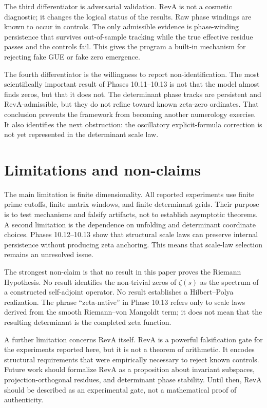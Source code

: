 \documentclass[11pt]{article}
\theoremstyle{definition}
\theoremstyle{plain}
\begin{document}
The third differentiator is adversarial validation.  RevA is not a cosmetic diagnostic; it changes the logical status of the results.  Raw phase windings are known to occur in controls.  The only admissible evidence is phase-winding persistence that survives out-of-sample tracking while the true effective residue passes and the controls fail.  This gives the program a built-in mechanism for rejecting fake GUE or fake zero emergence.

The fourth differentiator is the willingness to report non-identification.  The most scientifically important result of Phases 10.11--10.13 is not that the model almost finds zeros, but that it does not.  The determinant phase tracks are persistent and RevA-admissible, but they do not refine toward known zeta-zero ordinates.  That conclusion prevents the framework from becoming another numerology exercise.  It also identifies the next obstruction: the oscillatory explicit-formula correction is not yet represented in the determinant scale law.

\section{Limitations and non-claims}

The main limitation is finite dimensionality.  All reported experiments use finite prime cutoffs, finite matrix windows, and finite determinant grids.  Their purpose is to test mechanisms and falsify artifacts, not to establish asymptotic theorems.  A second limitation is the dependence on unfolding and determinant coordinate choices.  Phases 10.12--10.13 show that structural scale laws can preserve internal persistence without producing zeta anchoring.  This means that scale-law selection remains an unresolved issue.

The strongest non-claim is that no result in this paper proves the Riemann Hypothesis.  No result identifies the non-trivial zeros of $\zeta(s)$ as the spectrum of a constructed self-adjoint operator.  No result establishes a Hilbert--Polya realization.  The phrase ``zeta-native'' in Phase 10.13 refers only to scale laws derived from the smooth Riemann--von Mangoldt term; it does not mean that the resulting determinant is the completed zeta function.

A further limitation concerns RevA itself.  RevA is a powerful falsification gate for the experiments reported here, but it is not a theorem of arithmetic.  It encodes structural requirements that were empirically necessary to reject known controls.  Future work should formalize RevA as a proposition about invariant subspaces, projection-orthogonal residues, and determinant phase stability.  Until then, RevA should be described as an experimental gate, not a mathematical proof of authenticity.
\end{document}
